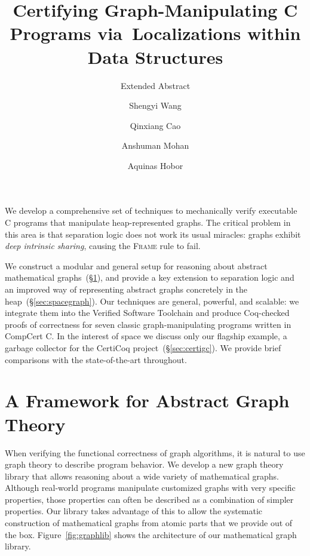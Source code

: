 \documentclass[sigplan, anonymous=false, review=false]{acmart}
\newcommand{\infrulestyle}[1]{\textsc{#1}}
\begin{document}
\title[Certifying Graph-Manipulating Programs]
{Certifying Graph-Manipulating C Programs via~Localizations within Data Structures}
\subtitle{Extended Abstract}

\author[S. Wang]{Shengyi Wang}

\author[Q. Cao]{Qinxiang Cao}

\author[A. Mohan]{Anshuman Mohan}

\author[A. Hobor]{Aquinas Hobor}

\maketitle

We develop a comprehensive set of techniques to mechanically verify 
executable C programs that manipulate heap-represented graphs. 
The critical problem in this area is that
separation logic does not work its usual miracles: graphs 
exhibit \emph{deep intrinsic sharing}, causing the \infrulestyle{Frame}
rule to fail. 

We construct a modular and general setup for 
reasoning about abstract mathematical graphs~(\S\ref{sec:mathgraph}), and provide
a key extension to separation logic and an improved way of representing 
abstract graphs concretely in the heap~(\S\ref{sec:spacegraph}). 
Our techniques are general, powerful, and scalable: 
we integrate them into the Verified Software Toolchain and produce Coq-checked 
proofs of correctness for seven classic graph-manipulating 
programs written in CompCert C. In the interest of space we discuss
only our flagship example, a garbage collector 
for the CertiCoq project~(\S\ref{sec:certigc}).
We provide brief comparisons with the state-of-the-art throughout.

\section{A Framework for Abstract Graph Theory}\label{sec:mathgraph}



When verifying the functional correctness of graph algorithms, it is natural
to use graph theory to describe program behavior.
We develop a new graph theory library that allows reasoning about a 
wide variety of mathematical graphs. Although real-world 
programs manipulate customized graphs with very specific properties, 
those properties can often be described as a combination of 
simpler properties. Our library takes advantage of this
to allow the systematic construction of mathematical graphs from atomic 
parts that we provide out of the box. 
Figure~\ref{fig:graphlib} shows the architecture of our
mathematical graph library.
\end{document}
